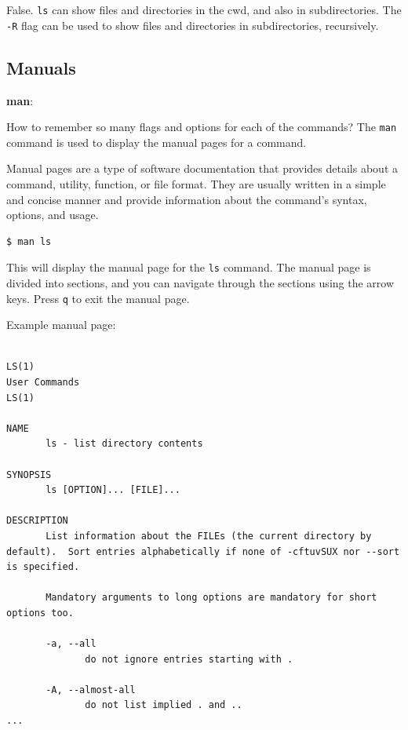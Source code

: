 \begin{ans}
  False. \texttt{ls} can show files and directories in the cwd, and also in subdirectories.
  The \texttt{-R} flag can be used to show files and directories in subdirectories, recursively.
\end{ans}


\subsection{Manuals}

\textbf{man}:

How to remember so many flags and options for each of the commands?
The \texttt{man} command is used to display the manual pages for a command.

\begin{definition}
  Manual pages are a type of software documentation that provides details about a command, utility, function, or file format. They are usually written in a simple and concise manner and provide information about the command's syntax, options, and usage.
\end{definition}

\begin{lstlisting}[language=bash]
  $ man ls
\end{lstlisting}

This will display the manual page for the \texttt{ls} command. The manual page is divided into sections, and you can navigate through the sections using the arrow keys. Press \texttt{q} to exit the manual page.

Example manual page:

\begin{lstlisting}

LS(1)                                                                                User Commands                                                                               LS(1)

NAME
       ls - list directory contents

SYNOPSIS
       ls [OPTION]... [FILE]...

DESCRIPTION
       List information about the FILEs (the current directory by default).  Sort entries alphabetically if none of -cftuvSUX nor --sort is specified.

       Mandatory arguments to long options are mandatory for short options too.

       -a, --all
              do not ignore entries starting with .

       -A, --almost-all
              do not list implied . and ..
...
\end{lstlisting}

